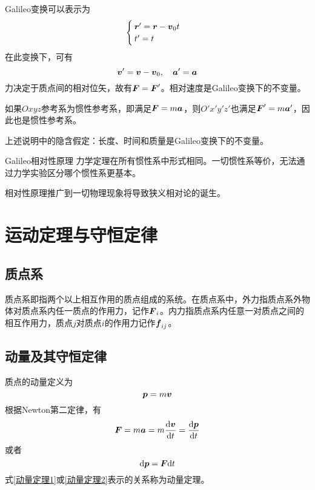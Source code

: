Galileo变换可以表示为
\begin{equation}
	\begin{cases}
		\boldsymbol{r}' = \boldsymbol{r} - \boldsymbol{v}_0t \\
		t' = t
	\end{cases}
\end{equation}
在此变换下，可有
\begin{equation}
	\boldsymbol{v}' = \boldsymbol{v} - \boldsymbol{v}_0,\quad \boldsymbol{a}' = \boldsymbol{a}
\end{equation}
力决定于质点间的相对位矢，故有$\boldsymbol{F} = \boldsymbol{F}'$。相对速度是Galileo变换下的不变量。

如果$Oxyz$参考系为惯性参考系，即满足$\boldsymbol{F} = m\boldsymbol{a}$，则$O'x'y'z'$也满足$\boldsymbol{F}' = m\boldsymbol{a}'$，因此也是惯性参考系。

上述说明中的隐含假定：长度、时间和质量是Galileo变换下的不变量。

{\heiti Galileo相对性原理} \quad 力学定理在所有惯性系中形式相同。一切惯性系等价，无法通过力学实验区分哪个惯性系更基本。

相对性原理推广到一切物理现象将导致狭义相对论的诞生。

\section{运动定理与守恒定律}

\subsection{质点系}

质点系即指两个以上相互作用的质点组成的系统。在质点系中，{\heiti 外力}指质点系外物体对质点系内任一质点的作用力，记作$\boldsymbol{F}_i$。{\heiti 内力}指质点系内任意一对质点之间的相互作用力，质点$j$对质点$i$的作用力记作$\boldsymbol{f}_{ij}$。

\subsection{动量及其守恒定律}

质点的{\heiti 动量}定义为
\begin{equation}
	\boldsymbol{p} = m\boldsymbol{v}
\end{equation}
根据Newton第二定律，有
\begin{equation}
	\boldsymbol{F} = m\boldsymbol{a} = m\frac{\mathrm{d} \boldsymbol{v}}{\mathrm{d} t} = \frac{\mathrm{d} \boldsymbol{p}}{\mathrm{d} t}
	\label{动量定理1}
\end{equation}
或者
\begin{equation}
	\mathrm{d} \boldsymbol{p} = \boldsymbol{F} \mathrm{d} t
	\label{动量定理2}
\end{equation}
式\eqref{动量定理1}或\eqref{动量定理2}表示的关系称为{\heiti 动量定理}。

